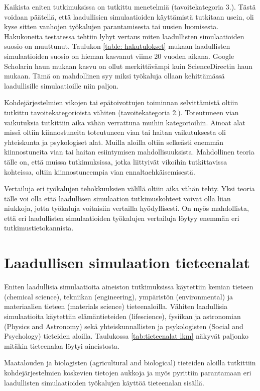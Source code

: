 \documentclass[utf8]{gradu3}
\begin{document}
Kaikista eniten tutkimuksissa on tutkittu menetelmiä (tavoitekategoria 3.).
Tästä voidaan päätellä, että laadullisien simulaatioiden käyttämistä 
tutkitaan usein, oli kyse sitten vanhojen työkalujen parantamisesta tai 
uusien luomisesta. 
Hakukoneita testatessa tehtiin lyhyt vertaus miten laadullisten simulaatioiden suosio on 
muuttunut. Taulukon \ref{table: hakutulokset} mukaan laadullisten simulaatioiden 
suosio on hieman kasvanut viime 20 vuoden aikana. Google Scholarin haun mukaan kasvu on ollut
merkittävämpi kuin ScienceDirectin haun mukaan.
Tämä on mahdollinen syy miksi työkaluja ollaan kehittämässä laadullisille simulaatioille
niin paljon.

Kohdejärjestelmien vikojen tai epätoivottujen toiminnan selvittämistä 
oltiin tutkittu tavoitekategorioista vähiten (tavoitekategoria 2.).
Toteutuneen vian vaikutuksia tutkittiin aika vähän 
verrattuna muihin kategorioihin. 
Ainoat alat missä oltiin kiinnostuneita toteutuneen vian tai haitan vaikutuksesta
oli yhteiskunta ja psykologiset alat. 
Muilla aloilla oltiin selkeästi enemmän kiinnostuneita
vian tai haitan esiintymisen mahdollisuuksista.
Mahdollinen teoria tälle on, että muissa tutkimuksissa, 
jotka liittyivät vikoihin tutkittavissa kohteissa, 
oltiin kiinnostuneempia vian ennaltaehkäisemisestä.

Vertailuja eri työkalujen tehokkuuksien välillä oltiin aika vähän tehty. 
Yksi teoria tälle voi  olla että laadullisen simulaation tutkimuskohteet 
voivat olla liian niukkoja, jotta työkaluja voitaisiin vertailla hyödyllisesti.
On myös mahdollista, että eri laadullisten simulaatioiden työkalujen vertailuja 
löytyy enemmän eri tutkimustietokannista.

\section{Laadullisen simulaation tieteenalat}
Eniten laadullisia simulaatioita aineiston tutkimuksissa
käytettiin kemian tieteen (chemical science),
tekniikan (engineering), ympäristön (environmental) ja materiaalien tieteen  (materials science) tieteenaloilla. 
Vähiten laadullisia simulaatioita käytettiin elämäntieteiden (lifescience),
fysiikan ja astronomian  (Physics and Astronomy) sekä 
yhteiskunnallisten ja psykologisten (Social and Psychology) tieteiden aloilla.
Taulukossa \ref{tab:tieteenalat lkm} näkyvät paljonko mitäkin tieteenalaa
löytyi aineistosta.

Maatalouden ja biologisten (agricultural and biological) tieteiden aloilla
tutkittiin kohdejärjestelmien koskevien tietojen aukkoja ja myös pyrittiin
parantamaan eri laadullisten simulaatioiden työkalujen käyttöä tieteenalan
sisällä.
\end{document}

